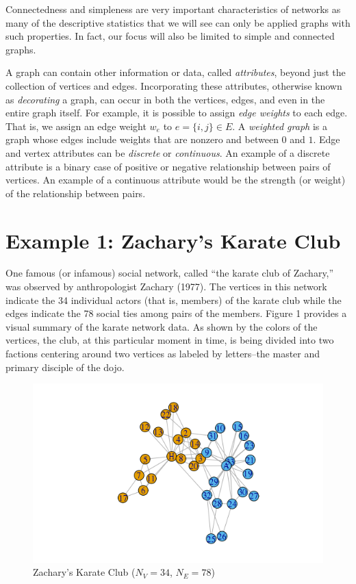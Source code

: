 \documentclass[12pt,twoside]{amherstthesis}
\begin{document}
  Connectedness and simpleness are very important characteristics of
  networks as many of the descriptive statistics that we will see can only
  be applied graphs with such properties. In fact, our focus will also be
  limited to simple and connected graphs.
  
  A graph can contain other information or data, called \emph{attributes},
  beyond just the collection of vertices and edges. Incorporating these
  attributes, otherwise known as \emph{decorating} a graph, can occur in
  both the vertices, edges, and even in the entire graph itself. For
  example, it is possible to assign \emph{edge weights} to each edge. That
  is, we assign an edge weight \(w_e\) to \(e = \{i, j\} \in E\). A
  \emph{weighted graph} is a graph whose edges include weights that are
  nonzero and between \(0\) and \(1\). Edge and vertex attributes can be
  \emph{discrete} or \emph{continuous}. An example of a discrete attribute
  is a binary case of positive or negative relationship between pairs of
  vertices. An example of a continuous attribute would be the strength (or
  weight) of the relationship between pairs.
  
  \section{Example 1: Zachary's Karate
  Club}\label{example-1-zacharys-karate-club}
  
  One famous (or infamous) social network, called ``the karate club of
  Zachary,'' was observed by anthropologist Zachary (1977). The vertices
  in this network indicate the 34 individual actors (that is, members) of
  the karate club while the edges indicate the 78 social ties among pairs
  of the members. Figure 1 provides a visual summary of the karate network
  data. As shown by the colors of the vertices, the club, at this
  particular moment in time, is being divided into two factions centering
  around two vertices as labeled by letters--the master and primary
  disciple of the dojo.
  
  \begin{figure}[htbp]
  \centering
  \includegraphics{figure/01karateplot.png}
  \caption{Zachary's Karate Club (\(N_V = 34\), \(N_E = 78\))}
  \end{figure}
  
\end{document}
